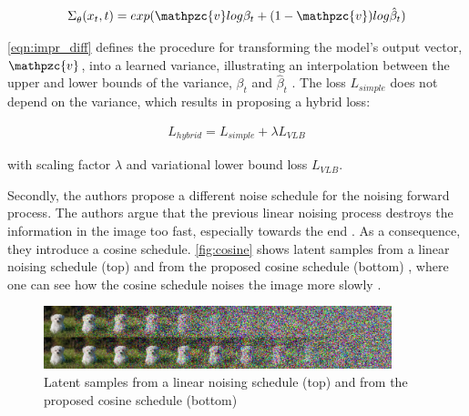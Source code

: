 \begin{equation}
    \label{eqn:impr_diff}
    \begin{align*}
        \Sigma_{\theta}^{}(x_t,t)=exp(\mathpzc{v}log\beta_t+(1-\mathpzc{v})log\hat{\beta}_t)
    \end{align*}
\end{equation}

\autoref{eqn:impr_diff} defines the procedure for transforming the model's output vector, $\mathpzc{v}$, into a learned variance, illustrating an interpolation between the upper and lower bounds of the variance, $\beta_t$ and $\hat{\beta}_t$ \cite{nichol2021ImprovedDenoisingDiffusion}.
The loss $L_{simple}$ does not depend on the variance, which results in \cite{nichol2021ImprovedDenoisingDiffusion} proposing a hybrid loss:

\begin{equation}
    \label{eqn:l_hybrid}
    \begin{align*}
        L_{hybrid} =L_{simple}+\lambda L_{VLB}
    \end{align*}
\end{equation}

with scaling factor $\lambda$ and variational lower bound loss $L_{VLB}$.

Secondly, the authors propose a different noise schedule for the noising forward process.
The authors argue that the previous linear noising process destroys the information in the image too fast, especially towards the end \cite{nichol2021ImprovedDenoisingDiffusion}.
As a consequence, they introduce a cosine schedule.
\autoref{fig:cosine} shows latent samples from a linear noising schedule (top) and from the proposed cosine schedule (bottom) \cite[Figure 3, p. 4]{nichol2021ImprovedDenoisingDiffusion}, where one can see how the cosine schedule noises the image more slowly \cite{nichol2021ImprovedDenoisingDiffusion}.

\begin{figure}[h]
    \centering
    \includegraphics[width=0.9\textwidth]{images/cosine.png}
    \caption[Noising Schedule]{Latent samples from a linear noising schedule (top) and from the proposed cosine schedule (bottom) \cite[Figure 3, p. 4]{nichol2021ImprovedDenoisingDiffusion}}
    \label{fig:cosine}
\end{figure}

